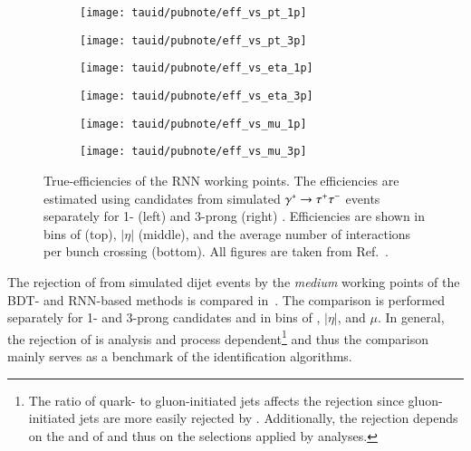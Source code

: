 \begin{figure}[htbp]

  \begin{subfigure}{0.498\textwidth}
    \texttt{[image: tauid/pubnote/eff\_vs\_pt\_1p]}
    \subcaption{}%
    \label{fig:tauid_truetau_eff_a}
  \end{subfigure}\hfill%
  \begin{subfigure}{0.498\textwidth}
    \texttt{[image: tauid/pubnote/eff\_vs\_pt\_3p]}
    \subcaption{}%
    \label{fig:tauid_truetau_eff_b}
  \end{subfigure}

  \begin{subfigure}{0.498\textwidth}
    \texttt{[image: tauid/pubnote/eff\_vs\_eta\_1p]}
    \subcaption{}
  \end{subfigure}\hfill%
  \begin{subfigure}{0.498\textwidth}
    \texttt{[image: tauid/pubnote/eff\_vs\_eta\_3p]}
    \subcaption{}
  \end{subfigure}

  \begin{subfigure}{0.498\textwidth}
    \texttt{[image: tauid/pubnote/eff\_vs\_mu\_1p]}
    \subcaption{}
  \end{subfigure}\hfill%
  \begin{subfigure}{0.498\textwidth}
    \texttt{[image: tauid/pubnote/eff\_vs\_mu\_3p]}
    \subcaption{}
  \end{subfigure}

  \caption[True-\tauhadvis efficiencies of the RNN \tauid working
  points.]{True-\tauhadvis efficiencies of the RNN \tauid working points. The
    efficiencies are estimated using \tauhadvis candidates from simulated
    $\gamma^{*} \to \tau^{+} \tau^{-}$ events separately for 1- (left) and 3-prong (right)
    \tauhadvis. Efficiencies are shown in bins of \tauhadvis \pT (top),
    \tauhadvis $|\eta|$ (middle), and the average number of interactions per
    bunch crossing (bottom). All figures are taken from
    Ref.~\cite{ATL-PHYS-PUB-2019-033}.}%
  \label{fig:tauid_truetau_eff}
\end{figure}

The rejection of \faketauhadvis from simulated dijet events by the \emph{medium}
\tauid working points of the BDT- and RNN-based methods is compared
in~. The comparison is performed separately for 1-
and 3-prong \tauhadvis candidates and in bins of \tauhadvis \pT, \tauhadvis
$|\eta|$, and $\mu$. In general, the \faketauhadvis rejection of \tauid is
analysis and process dependent\footnote{The ratio of quark- to gluon-initiated
  jets affects the \faketauhadvis rejection since gluon-initiated jets are more
  easily rejected by \tauid. Additionally, the rejection depends on the \pT and
  \Ntracks of \faketauhadvis and thus on the selections applied by analyses.}
and thus the comparison mainly serves as a benchmark of the identification
algorithms.

